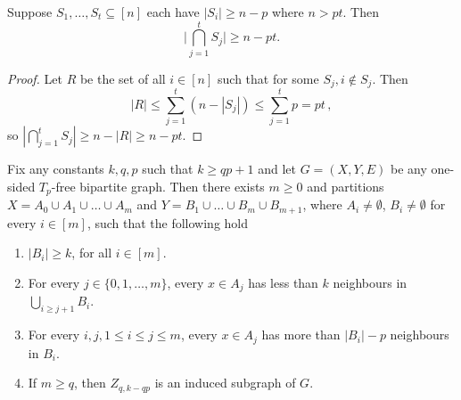 \documentclass{article}
\begin{document}
\begin{proposition}
\label{prop:intersections}
Suppose $S_1, \dotsc, S_t \subseteq [n]$ each have $|S_i| \geq n-p$ where $n > pt$. Then
\[\Bigg|\bigcap_{j =1}^t S_j\Bigg| \geq n-pt.\]
\end{proposition}
\begin{proof}
Let $R$ be the set of all $i \in [n]$ such that for some $S_j, i \notin S_j$. Then
\[
  |R| \leq \sum_{j=1}^t (n - |S_j|) \leq \sum_{j=1}^t p = pt \,,
\]
so $\left|\bigcap_{j=1}^t S_j\right| \geq n-|R| \geq n-pt$.
\end{proof}


\begin{lemma}
\label{lemma:tp free structure}
Fix any constants $k,q,p$ such that $k \geq qp+1$ and let $G = (X,Y,E)$ be any one-sided $T_p$-free bipartite graph. %
Then there exists $m \geq 0$ and partitions $X =A_0 \cup  A_1 \cup \ldots \cup A_m$ and
$Y = B_1 \cup \ldots \cup B_m \cup B_{m+1}$, where $A_i \neq \emptyset$, $B_i \neq \emptyset$
for every $i \in [m]$, such that the following hold
\begin{enumerate}[label=\textup{(\arabic*)}]
	\item $|B_i| \geq k$, for all $i \in [m]$.
	\item For every $j \in \{0,1, \ldots, m\}$, every $x \in A_j$ has less than $k$ neighbours in $\bigcup_{i \geq j+1} B_i$.
	\item For every $i,j, 1 \leq i \leq j \leq m$, every $x \in A_j$ has more than $|B_i| - p$ neighbours in $B_i$.
	\item If $m \geq q$, then $Z_{q,k-qp}$ is an induced subgraph of $G$.
\end{enumerate}
\end{lemma}
\end{document}
